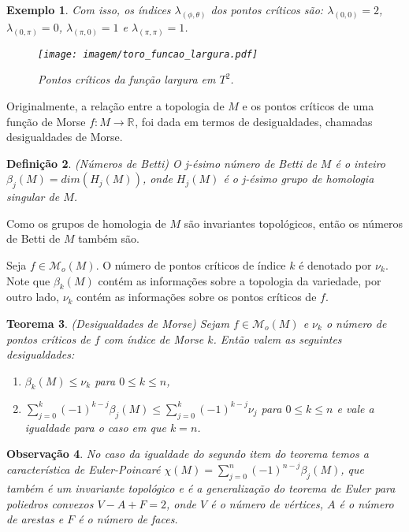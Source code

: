 \documentclass[12pt]{book}
\newtheorem{teorema}{Teorema}[section]
\newtheorem{definicao}[teorema]{Definição}
\newtheorem{exemplo}[teorema]{Exemplo}
\newtheorem{observacao}[teorema]{Observação}
\newcommand{\funcoesmorse}[1]{\mathcal{M}_{o}(#1)}
\newcommand{\real}[1]{\mathbb{R}^{#1}}
\newcommand{\reta}{\real{}}
\begin{document}
\begin{exemplo}
			Com isso, os índices $\lambda_{(\phi, \theta)}$ dos pontos críticos são: $\lambda_{(0,0)} = 2$, $\lambda_{(0,\pi)} = 0$, $\lambda_{(\pi,0)} = 1$ e $\lambda_{(\pi,\pi)} = 1$.
			
			\begin{figure}[!h]
				\centering
				\texttt{[image: imagem/toro\_funcao\_largura.pdf]}
				\caption{Pontos críticos da função largura em $T^{2}$.}
				\label{figura_toro_funcao_altura}
			\end{figure}
	\end{exemplo}

	Originalmente, a relação entre a topologia de $M$ e os pontos críticos de uma função de Morse $f:M \to \reta$, foi dada em termos de desigualdades, chamadas desigualdades de Morse.
	
	\begin{definicao}
		(Números de Betti) O j-ésimo número de Betti de $M$ é o inteiro $\beta_{j}(M) = dim(H_{j}(M))$, onde $H_{j}(M)$ é o j-ésimo grupo de homologia singular de $M$.
	\end{definicao}
	
	Como os grupos de homologia de $M$ são invariantes topológicos, então os números de Betti de $M$ também são.
	
	Seja $f \in \funcoesmorse{M}$. O número de pontos críticos de índice $k$ é denotado por $\nu_{k}$. Note que $\beta_{k}(M)$ contém as informações sobre a topologia da variedade, por outro lado, $\nu_{k}$ contém as informações sobre os pontos críticos de $f$.
	
	\begin{teorema}
		(Desigualdades de Morse) Sejam $f \in \funcoesmorse{M}$ e $\nu_{k}$ o número de pontos críticos de $f$ com índice de Morse $k$. Então valem as seguintes desigualdades:
		\begin{enumerate}
			\item $\beta_{k}(M) \leq \nu_{k}$ para $0\leq k\leq n$,
			
			\item $\sum_{j = 0}^{k}(-1)^{k-j}\beta_{j}(M) \leq \sum_{j = 0}^{k}(-1)^{k-j}\nu_{j} $ para $0 \leq k \leq n$ e vale a igualdade para o caso em que $k=n$.
		\end{enumerate}
	\end{teorema}
	
	\begin{observacao}
		No caso da igualdade do segundo item do teorema temos a característica de Euler-Poincaré $\chi(M) = \sum_{j = 0}^{n}(-1)^{n-j}\beta_{j}(M)$, que também é um invariante topológico e é a generalização do teorema de Euler para poliedros convexos $V-A+F = 2$, onde $V$ é o número de vértices, $A$ é o número de arestas e $F$ é o número de faces.
	\end{observacao}
	
\end{document}
